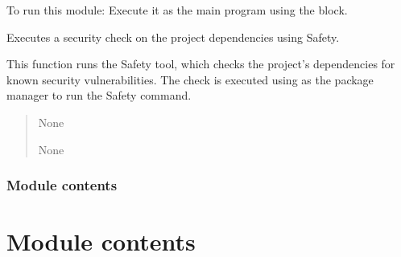 \documentclass[letterpaper,10pt,english]{sphinxmanual}
\begin{document}
\sphinxAtStartPar
To run this module:
\sphinxhyphen{} Execute it as the main program using the  block.

\begin{fulllineitems}
\label{\detokenize{modules.security:modules.security.scan_dependencies.run_safety_check}}
\pysigstartsignatures
\pysiglinewithargsret
{}
{}
{}
\pysigstopsignatures
\sphinxAtStartPar
Executes a security check on the project dependencies using Safety.

\sphinxAtStartPar
This function runs the Safety tool, which checks the project’s dependencies for known security vulnerabilities.
The check is executed using  as the package manager to run the Safety command.
\begin{quote}\begin{description}
\sphinxAtStartPar
None

\sphinxAtStartPar
None

\end{description}\end{quote}

\end{fulllineitems}



\subsubsection{Module contents}
\label{\detokenize{modules.security:module-modules.security}}\label{\detokenize{modules.security:module-contents}}

\section{Module contents}
\label{\detokenize{modules:module-modules}}\label{\detokenize{modules:module-contents}}
\sphinxstepscope
\end{document}
